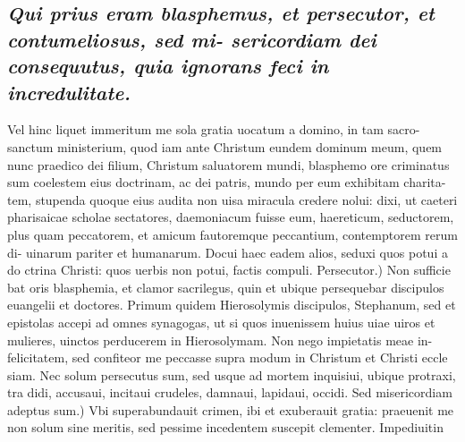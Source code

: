 \documentclass{article}
\begin{document}
\begin{pages}
\subsection*{\textit{Qui prius eram blasphemus, et persecutor, et contumeliosus, sed mi- sericordiam dei consequutus, quia ignorans feci in incredulitate. }}\pstart Vel hinc liquet immeritum me sola gratia uocatum a domino, in tam sacro- sanctum ministerium, quod iam ante Christum eundem dominum meum, quem nunc praedico dei filium, Christum saluatorem mundi, blasphemo ore criminatus sum coelestem eius doctrinam, ac dei patris, mundo per eum exhibitam charita- tem, stupenda quoque eius audita non uisa miracula credere nolui: dixi, ut caeteri pharisaicae scholae sectatores, daemoniacum fuisse eum, haereticum, seductorem, plus quam peccatorem, et amicum fautoremque peccantium, contemptorem rerum di- uinarum pariter et humanarum. Docui haec eadem alios, seduxi quos potui a do ctrina Christi: quos uerbis non potui, factis compuli. Persecutor.) Non sufficie bat oris blasphemia, et clamor sacrilegus, quin et ubique persequebar discipulos euangelii et doctores. Primum quidem Hierosolymis discipulos, Stephanum, sed et epistolas accepi ad omnes synagogas, ut si quos inuenissem huius uiae uiros et mulieres, uinctos perducerem in Hierosolymam. Non nego impietatis meae in- felicitatem, sed confiteor me peccasse supra modum in Christum et Christi eccle siam. Nec solum persecutus sum, sed usque ad mortem inquisiui, ubique protraxi, tra didi, accusaui, incitaui crudeles, damnaui, lapidaui, occidi. Sed misericordiam adeptus sum.) Vbi superabundauit crimen, ibi et exuberauit gratia: praeuenit me non solum sine meritis, sed pessime incedentem suscepit clementer. Impediuitin  \pend

\end{pages}
\end{document}
